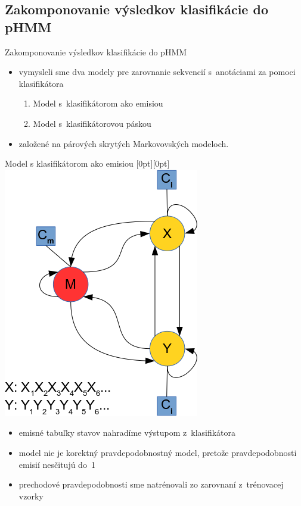\documentclass[xcolor=dvipsnames, compress, 12pt]{beamer}
\newcommand{\lenitem}[2][.6\linewidth]{\parbox[t]{#1}{\strut #2\strut}}
\theoremstyle{definition}
\begin{document}
\subsection{Zakomponovanie výsledkov klasifikácie do pHMM}
\begin{frame}{Zakomponovanie výsledkov klasifikácie do pHMM}

\begin{itemize}
  \item vymysleli sme dva modely pre zarovnanie sekvencií s~anotáciami za pomoci klasifikátora
  \begin{enumerate}
    \item Model s~klasifikátorom ako emisiou
    \item Model s~klasifikátorovou páskou
  \end{enumerate}
  \item založené na párových skrytých Markovovských modeloch.
\end{itemize}

\end{frame}

\begin{frame}{Model s klasifikátorom ako emisiou}
  \mbox{}\hfill\raisebox{-\height}[0pt][0pt]{
   \includegraphics[width=.30\textwidth]{images/zakladny_model}
   }
  \vspace*{-\baselineskip}

  \begin{itemize}
    \item \lenitem{emisné tabuľky stavov nahradíme výstupom z~klasifikátora}
    \item \lenitem{model nie je korektný pravdepodobnostný model, pretože pravdepodobnosti emisií nesčitujú do~1}
    \item \lenitem{prechodové pravdepodobnosti sme natrénovali zo zarovnaní z~trénovacej vzorky}
  \end{itemize}
\end{frame}

\end{document}
